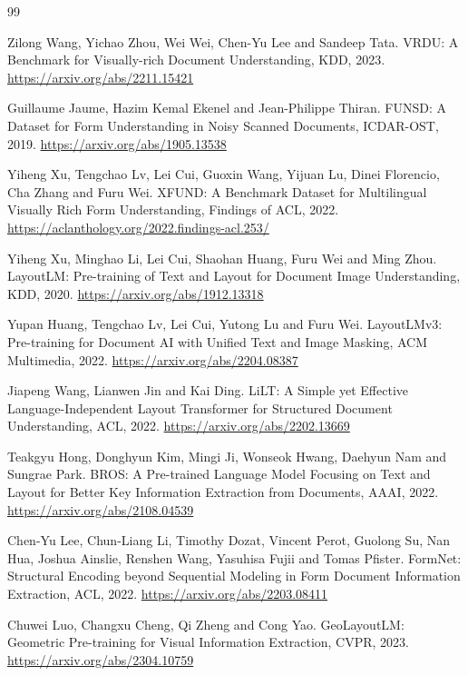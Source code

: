 \documentclass[11pt,a4paper]{article}
\begin{document}
\begin{thebibliography}{99}
\small

 Zilong Wang, Yichao Zhou, Wei Wei, Chen-Yu Lee and Sandeep Tata. VRDU: A Benchmark for Visually-rich Document Understanding, KDD, 2023. \url{https://arxiv.org/abs/2211.15421}

 Guillaume Jaume, Hazim Kemal Ekenel and Jean-Philippe Thiran. FUNSD: A Dataset for Form Understanding in Noisy Scanned Documents, ICDAR-OST, 2019. \url{https://arxiv.org/abs/1905.13538}

 Yiheng Xu, Tengchao Lv, Lei Cui, Guoxin Wang, Yijuan Lu, Dinei Florencio, Cha Zhang and Furu Wei. XFUND: A Benchmark Dataset for Multilingual Visually Rich Form Understanding, Findings of ACL, 2022. \url{https://aclanthology.org/2022.findings-acl.253/}

 Yiheng Xu, Minghao Li, Lei Cui, Shaohan Huang, Furu Wei and Ming Zhou. LayoutLM: Pre-training of Text and Layout for Document Image Understanding, KDD, 2020. \url{https://arxiv.org/abs/1912.13318}

 Yupan Huang, Tengchao Lv, Lei Cui, Yutong Lu and Furu Wei. LayoutLMv3: Pre-training for Document AI with Unified Text and Image Masking, ACM Multimedia, 2022. \url{https://arxiv.org/abs/2204.08387}

 Jiapeng Wang, Lianwen Jin and Kai Ding. LiLT: A Simple yet Effective Language-Independent Layout Transformer for Structured Document Understanding, ACL, 2022. \url{https://arxiv.org/abs/2202.13669}

 Teakgyu Hong, Donghyun Kim, Mingi Ji, Wonseok Hwang, Daehyun Nam and Sungrae Park. BROS: A Pre-trained Language Model Focusing on Text and Layout for Better Key Information Extraction from Documents, AAAI, 2022. \url{https://arxiv.org/abs/2108.04539}

 Chen-Yu Lee, Chun-Liang Li, Timothy Dozat, Vincent Perot, Guolong Su, Nan Hua, Joshua Ainslie, Renshen Wang, Yasuhisa Fujii and Tomas Pfister. FormNet: Structural Encoding beyond Sequential Modeling in Form Document Information Extraction, ACL, 2022. \url{https://arxiv.org/abs/2203.08411}

 Chuwei Luo, Changxu Cheng, Qi Zheng and Cong Yao. GeoLayoutLM: Geometric Pre-training for Visual Information Extraction, CVPR, 2023. \url{https://arxiv.org/abs/2304.10759}


\end{thebibliography}
\end{document}
